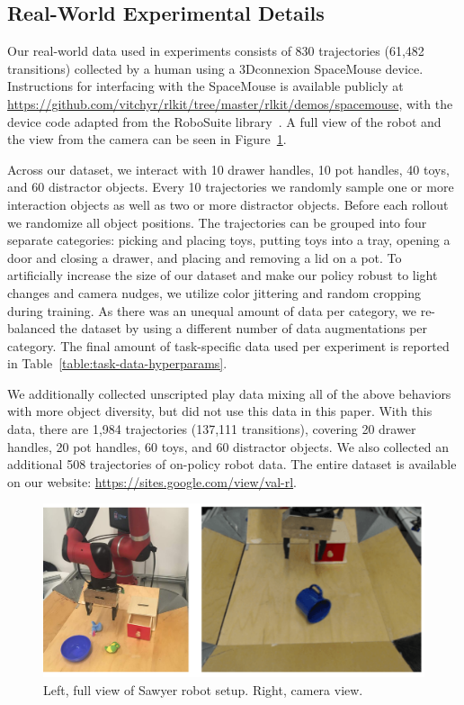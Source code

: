 \subsection{Real-World Experimental Details} \label{sec:appendix_real}

Our real-world data used in experiments consists of 830 trajectories (61,482 transitions) collected by a human using a 3Dconnexion SpaceMouse device. Instructions for interfacing with the SpaceMouse is available publicly at \url{https://github.com/vitchyr/rlkit/tree/master/rlkit/demos/spacemouse}, with the device code adapted from the RoboSuite library~\cite{robosuite2020}. A full view of the robot and the view from the camera can be seen in Figure~\ref{fig:appendix_robot}.

Across our dataset, we interact with 10 drawer handles, 10 pot handles, 40 toys, and 60 distractor objects. Every 10 trajectories we randomly sample one or more interaction objects as well as two or more distractor objects. Before each rollout we randomize all object positions. The trajectories can be grouped into four separate categories: picking and placing toys, putting toys into a tray, opening a door and closing a drawer, and placing and removing a lid on a pot. To artificially increase the size of our dataset and make our policy robust to light changes and camera nudges, we utilize color jittering and random cropping during training. As there was an unequal amount of data per category, we re-balanced the dataset by using a different number of data augmentations per category. The final amount of task-specific data used per experiment is reported in Table~\ref{table:task-data-hyperparams}.

We additionally collected unscripted play data mixing all of the above behaviors with more object diversity, but did not use this data in this paper. With this data, there are 1,984 trajectories (137,111 transitions), covering 20 drawer handles, 20 pot handles, 60 toys, and 60 distractor objects. We also collected an additional 508 trajectories of on-policy robot data. The entire dataset is available on our website: \url{https://sites.google.com/view/val-rl}.

\begin{figure}[b]
  \includegraphics[width=0.99\linewidth]{val/imgs/fig_appendix_robot.pdf}
  \caption{\small
  Left, full view of Sawyer robot setup. Right, camera view.
  }
  \label{fig:appendix_robot}
  \vspace{-0.5cm}
\end{figure}

